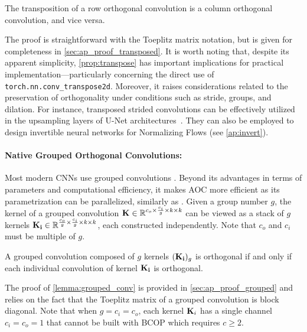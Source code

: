     \begin{proposition}\label{prop:transpose}
        The transposition of a row orthogonal convolution is a column orthogonal convolution, and vice versa.  
    \end{proposition}

    The proof is straightforward with the Toeplitz matrix notation, but is given for completeness in \cref{sec:ap_proof_transposed}.
    It is worth noting that, despite its apparent simplicity, \cref{prop:transpose} has important implications for practical implementation—particularly concerning the direct use of \texttt{torch.nn.conv\_transpose2d}. Moreover, it raises considerations related to the preservation of orthogonality under conditions such as stride, groups, and dilation. For instance, transposed strided convolutions can be effectively utilized in the upsampling layers of U-Net architectures~\cite{ronneberger2015u}.
    They can also be employed to design invertible neural networks for Normalizing Flows (see \cref{ap:invert}).
    

\paragraph{Native Grouped Orthogonal Convolutions:}\label{sec:group}
    Most modern CNNs use grouped convolutions \cite{howard2017mobilenets, xie2017aggregated, liu2022convnet}. Beyond its advantages in terms of parameters and computational efficiency, it makes AOC more efficient as its parametrization can be parallelized, similarly as \cite{gorbunov2024group,liuparameter}.
    Given a group number $g$, the kernel of a grouped convolution $\mathbf{K} \in \mathbb{R}^{c_o \times \frac{c_i}{g} \times k \times k}$ can be viewed as a stack of $g$ kernels $\mathbf{K_i} \in \mathbb{R}^{\frac{c_o}{g} \times \frac{c_i}{g} \times k \times k}$, each constructed independently. Note that $c_o$ and $c_i$ must be multiple of $g$. 
    \begin{proposition}\label{lemma:grouped_conv}
        A grouped convolution composed of $g$ kernels $(\mathbf{K_i})_g$ is orthogonal if and only if each individual convolution of kernel $\mathbf{K_i}$ is orthogonal. %
    \end{proposition}
    
    The proof of \cref{lemma:grouped_conv} is provided in \cref{sec:ap_proof_grouped} and relies on the fact that the Toeplitz matrix of a grouped convolution is block diagonal.
    \noindent Note that when $g = c_i = c_o$, each kernel $\mathbf{K}_i$ has a single channel $c_i=c_o=1$ that cannot be built with BCOP which requires $c\geq 2$.


